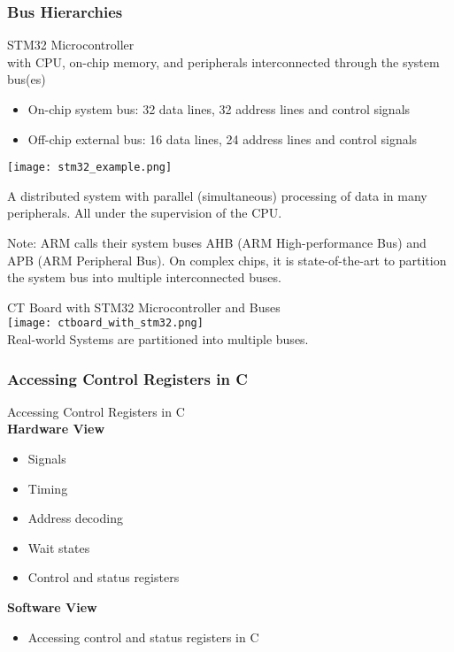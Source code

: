 \subsubsection{Bus Hierarchies}

\begin{example2}{STM32 Microcontroller}\\
    with CPU, on-chip memory, and peripherals interconnected through the system bus(es)
    \begin{itemize}
        \item On-chip system bus: 32 data lines, 32 address lines and control signals
        \item Off-chip external bus: 16 data lines, 24 address lines and control signals
    \end{itemize}
    \texttt{[image: stm32\_example.png]}

    A distributed system with parallel (simultaneous) processing of data in many peripherals. All under the supervision of the CPU.
\end{example2}

\begin{remark}
    Note: ARM calls their system buses AHB (ARM High-performance Bus) and APB (ARM
    Peripheral Bus). On complex chips, it is state-of-the-art to partition the system bus into
    multiple interconnected buses.
\end{remark}

\begin{example2}{CT Board with STM32 Microcontroller and Buses}\\
    \texttt{[image: ctboard\_with\_stm32.png]}\\
    Real-world Systems are partitioned into multiple buses.
\end{example2}


\subsubsection{Accessing Control Registers in C}

\begin{definition}{Accessing Control Registers in C}\\
    \textbf{Hardware View}
    \begin{itemize}
        \item Signals
        \item Timing
        \item Address decoding
        \item Wait states
        \item Control and status registers
    \end{itemize}
    \textbf{Software View}
    \begin{itemize}
        \item Accessing control and status registers in C
    \end{itemize}
\end{definition}

